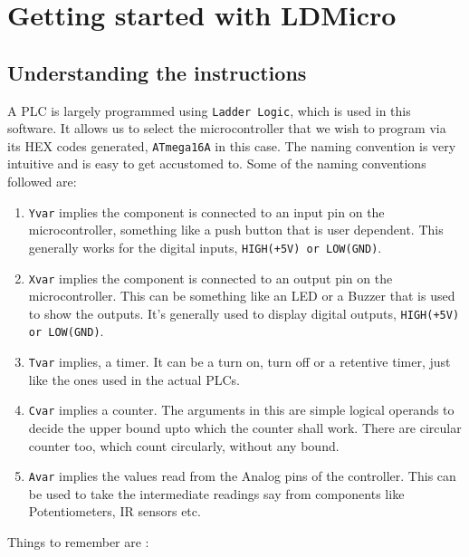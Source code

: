 \documentclass[12pt]{article}
\begin{document}
\newpage
{\Large \section{Getting started with LDMicro}}
{\large \subsection{Understanding the instructions}}
A PLC is largely programmed using \texttt{Ladder Logic}, which is used in this software. It allows us to select the microcontroller that we wish to program via its HEX codes generated, \texttt{ATmega16A} in this case. The naming convention is very intuitive and is easy to get accustomed to. Some of the naming conventions followed are:
\vspace{12pt}
\begin{enumerate}
\item \texttt{Yvar} implies the component is connected to an input pin on the microcontroller, something like a push button that is user dependent. This generally works for the digital inputs, \texttt{HIGH(+5V) or LOW(GND)}.
\item \texttt{Xvar} implies the component is connected to an output pin on the microcontroller. This can be something like an LED or a Buzzer that is used to show the outputs. It's generally used to display digital outputs, \texttt{HIGH(+5V) or LOW(GND)}.
\item \texttt{Tvar} implies, a timer. It can be a turn on, turn off or a retentive timer, just like the ones used in the actual PLCs.
\item \texttt{Cvar} implies a counter. The arguments in this are simple logical operands to decide the upper bound upto which the counter shall work. There are circular counter too, which count circularly, without any bound.
\item \texttt{Avar} implies the  values read from the Analog pins of the controller. This can be used to take the intermediate readings say from components like Potentiometers, IR sensors etc.
\end{enumerate}
\vspace{12pt}
Things to remember are :\vspace{12pt}
\end{document}
